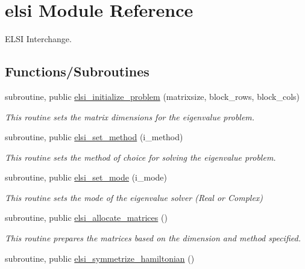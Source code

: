 \hypertarget{namespaceelsi}{}\section{elsi Module Reference}
\label{namespaceelsi}


E\+L\+S\+I Interchange.  


\subsection*{Functions/\+Subroutines}
\begin{DoxyCompactItemize}
\item 
subroutine, public \hyperlink{namespaceelsi_adb9219ba3ab342aef4277abbcb7c2533}{elsi\+\_\+initialize\+\_\+problem} (matrixsize, block\+\_\+rows, block\+\_\+cols)
\begin{DoxyCompactList}\small\item\em This routine sets the matrix dimensions for the eigenvalue problem. \end{DoxyCompactList}\item 
subroutine, public \hyperlink{namespaceelsi_a783f376d4233c7ddd34506025e9da783}{elsi\+\_\+set\+\_\+method} (i\+\_\+method)
\begin{DoxyCompactList}\small\item\em This routine sets the method of choice for solving the eigenvalue problem. \end{DoxyCompactList}\item 
subroutine, public \hyperlink{namespaceelsi_aae6ed67fce5603d05ec7c9a12e1d2f5e}{elsi\+\_\+set\+\_\+mode} (i\+\_\+mode)
\begin{DoxyCompactList}\small\item\em This routine sets the mode of the eigenvalue solver (Real or Complex) \end{DoxyCompactList}\item 
\hypertarget{namespaceelsi_a52d5a0efd881b80fa249a8f07b90249f}{}subroutine, public \hyperlink{namespaceelsi_a52d5a0efd881b80fa249a8f07b90249f}{elsi\+\_\+allocate\+\_\+matrices} ()\label{namespaceelsi_a52d5a0efd881b80fa249a8f07b90249f}

\begin{DoxyCompactList}\small\item\em This routine prepares the matrices based on the dimension and method specified. \end{DoxyCompactList}\item 
\hypertarget{namespaceelsi_a04a67c8d80ed033c08bdc21c09b9628a}{}subroutine, public \hyperlink{namespaceelsi_a04a67c8d80ed033c08bdc21c09b9628a}{elsi\+\_\+symmetrize\+\_\+hamiltonian} ()\label{namespaceelsi_a04a67c8d80ed033c08bdc21c09b9628a}


\end{DoxyCompactItemize}
